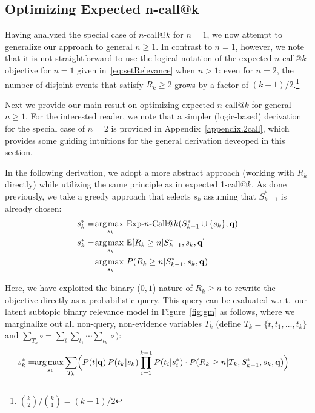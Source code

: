\subsection{Optimizing Expected n-call@k}

\label{subsec:ncall}

Having analyzed the special case of $n$-call@$k$ for $n=1$, we now
attempt to generalize our approach to general $n \geq 1$.  In contrast
to $n=1$, however, we note that it is not straightforward to use the
logical notation of the expected $n$-call@$k$ objective for $n=1$
given in~\eqref{eq:setRelevance} when $n > 1$: even for $n=2$, the
number of disjoint events that satisfy $R_k \geq 2$ grows by a factor
of $(k-1)/2$.\footnote{$\binom{k}{2} / \binom{k}{1} = (k-1)/2$}

Next we provide our main result on optimizing expected $n$-call@$k$
for general $n \geq 1$.  For the interested reader, we note that a
simpler (logic-based) derivation for the special case of $n=2$ is
provided in Appendix~\ref{appendix.2call}, which provides some guiding
intuitions for the general derivation deveoped in this section.
 
In the following derivation, we adopt a more abstract approach
(working with $R_k$ directly) while utilizing the same principle as in
expected 1-call@$k$.
As done previously, we take a greedy approach that 
selects $s_k$ assuming that $S_{k-1}^*$ is already chosen:
\begin{align}
  s_k^* & = \argmax_{s_k} \ExpNCall{n}(S_{k-1}^* \cup \{ s_k \},\vec{q}) \nonumber\\
  s_k^* & = \argmax_{s_k} \mathbb{E}[R_k\geq n|S_{k-1}^*,s_k,\vec{q}] \nonumber\\
  & = \argmax_{s_k} P(R_k\geq n|S_{k-1}^*,s_k,\vec{q}) \nonumber 
\end{align}

Here, we have exploited the binary ($0,1$) nature of $R_k \geq n$ to rewrite the objective
directly as a probabilistic query.
This query can be evaluated w.r.t.\ our latent subtopic binary relevance
model in Figure~\ref{fig:gm} as follows, where we marginalize out
all non-query, non-evidence variables $T_k$ $\big(\mbox{define } T_k\!=\!\{t,t_1,\dots,t_k\}$ and 
$\sum_{T_k} \circ = \sum_t \sum_{t_1} \cdots \sum_{t_k} \circ \big)$:
\begin{align}
  s_k^* = & \argmax_{s_k} \!\sum_{T_k} \Bigl( P(t|\vec{q}) \,P(t_k|s_k) \prod_{i=1}^{k-1} P(t_i|s_i^*) \cdot P(R_k\geq n|T_k,S_{k-1}^*,s_k,\vec{q}) \Bigr) \nonumber 
\end{align}

